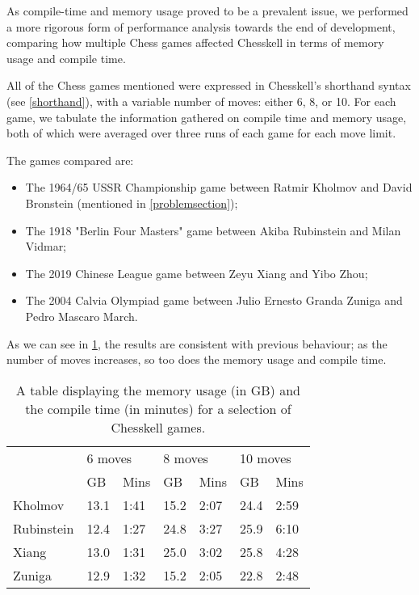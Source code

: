 As compile-time and memory usage proved to be a prevalent issue, we performed a more rigorous form of performance analysis towards the end of development, comparing how multiple Chess games affected Chesskell in terms of memory usage and compile time.

All of the Chess games mentioned were expressed in Chesskell's shorthand syntax (see \cref{shorthand}), with a variable number of moves: either 6, 8, or 10. For each game, we tabulate the information gathered on compile time and memory usage, both of which were averaged over three runs of each game for each move limit.

The games compared are:

\begin{itemize}
    \item The 1964/65 USSR Championship game between Ratmir Kholmov and David Bronstein (mentioned in \cref{problemsection});
    \item The 1918 "Berlin Four Masters" game between Akiba Rubinstein and Milan Vidmar;
    \item The 2019 Chinese League game between Zeyu Xiang and Yibo Zhou;
    \item The 2004 Calvia Olympiad game between Julio Ernesto Granda Zuniga and Pedro Mascaro March.
\end{itemize}

As we can see in \cref{performancetable}, the results are consistent with previous behaviour; as the number of moves increases, so too does the memory usage and compile time.


\begin{table}[h]
    \centering
    \label{performancetable}
    \begin{tabular}{l|ll|ll|ll}
                   & \multicolumn{2}{|l|}{6 moves} & \multicolumn{2}{|l|}{8 moves} & \multicolumn{2}{|l}{10 moves}                      \\
                   & GB                            & Mins                          & GB                            & Mins & GB   & Mins \\
        \hline
        Kholmov    & 13.1                          & 1:41                          & 15.2                          & 2:07 & 24.4 & 2:59 \\
        Rubinstein & 12.4                          & 1:27                          & 24.8                          & 3:27 & 25.9 & 6:10 \\
        Xiang      & 13.0                          & 1:31                          & 25.0                          & 3:02 & 25.8 & 4:28 \\
        Zuniga     & 12.9                          & 1:32                          & 15.2                          & 2:05 & 22.8 & 2:48
    \end{tabular}
    \caption{A table displaying the memory usage (in GB) and the compile time (in minutes) for a selection of Chesskell games.}
\end{table}

